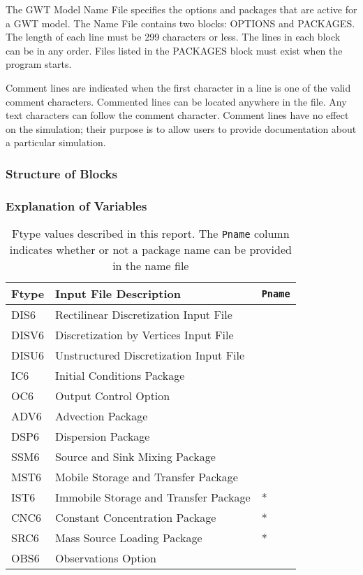 The GWT Model Name File specifies the options and packages that are active for a GWT model.  The Name File contains two blocks: OPTIONS  and PACKAGES. The length of each line must be 299 characters or less. The lines in each block can be in any order.  Files listed in the PACKAGES block must exist when the program starts. 

Comment lines are indicated when the first character in a line is one of the valid comment characters.  Commented lines can be located anywhere in the file. Any text characters can follow the comment character. Comment lines have no effect on the simulation; their purpose is to allow users to provide documentation about a particular simulation. 

\vspace{5mm}
\subsubsection{Structure of Blocks}



\vspace{5mm}
\subsubsection{Explanation of Variables}
\begin{description}

\end{description}

\begin{table}[H]
\caption{Ftype values described in this report.  The \texttt{Pname} column indicates whether or not a package name can be provided in the name file}
\small
\begin{center}
\begin{tabular*}{\columnwidth}{l l l}
\hline
\hline
Ftype & Input File Description & \texttt{Pname}\\
\hline
DIS6 & Rectilinear Discretization Input File \\
DISV6 & Discretization by Vertices Input File \\
DISU6 & Unstructured Discretization Input File \\
IC6 & Initial Conditions Package \\
OC6 & Output Control Option \\
ADV6 & Advection Package \\ 
DSP6 & Dispersion Package \\ 
SSM6 & Source and Sink Mixing Package \\ 
MST6 & Mobile Storage and Transfer Package \\
IST6 & Immobile Storage and Transfer Package & * \\
CNC6 & Constant Concentration Package & *\\ 
SRC6 & Mass Source Loading Package & * \\ 
OBS6 & Observations Option \\
\hline 
\end{tabular*}
\label{table:ftype}
\end{center}
\normalsize
\end{table}

